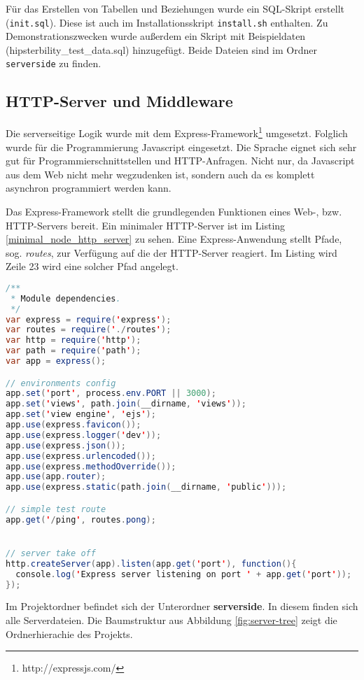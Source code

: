 Für das Erstellen von Tabellen und Beziehungen wurde ein \ac{SQL}-Skript erstellt (\texttt{init.sql}).
Diese ist auch im Installationsskript \texttt{install.sh} enthalten.
Zu Demonstrationszwecken wurde außerdem ein Skript mit Beispieldaten (hipsterbility\_test\_data.sql) hinzugefügt.
Beide Dateien sind im Ordner \texttt{serverside} zu finden.


\subsection{HTTP-Server und Middleware \label{sec:http-server-middleware}}
Die serverseitige Logik wurde mit dem Express-Framework\footnote{http://expressjs.com/} umgesetzt. 
Folglich wurde für die Programmierung Javascript eingesetzt. Die Sprache eignet sich sehr gut für Programmierschnittstellen und HTTP-Anfragen. 
Nicht nur, da Javascript aus dem Web nicht mehr wegzudenken ist, sondern auch da es komplett asynchron programmiert werden kann. 

Das Express-Framework stellt die grundlegenden Funktionen eines Web-, bzw. HTTP-Servers bereit.
Ein minimaler HTTP-Server ist im Listing \ref{minimal_node_http_server} zu sehen. 
Eine Express-Anwendung stellt Pfade, sog. \emph{routes}, zur Verfügung auf die der HTTP-Server reagiert. Im Listing wird Zeile 23 wird eine solcher Pfad angelegt. 

\begin{lstlisting}[label=minimal_node_http_server,language=Java, caption=Minimaler Node-HTTP-Server]
/**
 * Module dependencies.
 */
var express = require('express');
var routes = require('./routes');
var http = require('http');
var path = require('path');
var app = express();

// environments config
app.set('port', process.env.PORT || 3000);
app.set('views', path.join(__dirname, 'views'));
app.set('view engine', 'ejs');
app.use(express.favicon());
app.use(express.logger('dev'));
app.use(express.json());
app.use(express.urlencoded());
app.use(express.methodOverride());
app.use(app.router);
app.use(express.static(path.join(__dirname, 'public')));

// simple test route
app.get('/ping', routes.pong);


// server take off
http.createServer(app).listen(app.get('port'), function(){
  console.log('Express server listening on port ' + app.get('port'));
});
\end{lstlisting}

Im Projektordner befindet sich der Unterordner \textbf{serverside}. In diesem finden sich alle Serverdateien. 
Die Baumstruktur aus Abbildung \ref{fig:server-tree} zeigt die Ordnerhierachie des Projekts.

